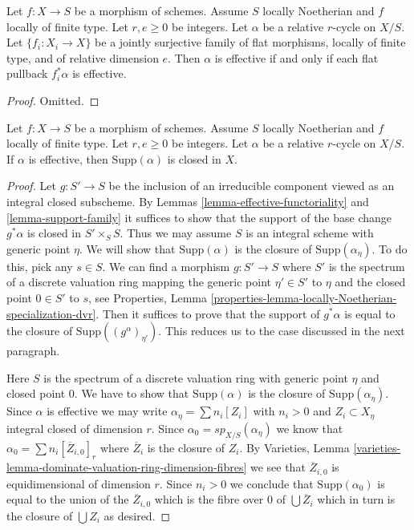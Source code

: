 \begin{lemma}
\label{lemma-effective-descent-pullbacks}
Let $f : X \to S$ be a morphism of schemes. Assume $S$ locally Noetherian
and $f$ locally of finite type. Let $r, e \geq 0$ be integers.
Let $\alpha$ be a relative $r$-cycle on $X/S$.
Let $\{f_i : X_i \to X\}$ be a jointly surjective family
of flat morphisms, locally of finite type, and of relative dimension $e$.
Then $\alpha$ is effective if and only if each flat
pullback $f_i^*\alpha$ is effective.
\end{lemma}

\begin{proof}
Omitted.
\end{proof}

\begin{lemma}
\label{lemma-effective-support-closed}
Let $f : X \to S$ be a morphism of schemes. Assume $S$ locally Noetherian
and $f$ locally of finite type. Let $r, e \geq 0$ be integers.
Let $\alpha$ be a relative $r$-cycle on $X/S$.
If $\alpha$ is effective, then $\text{Supp}(\alpha)$ is
closed in $X$.
\end{lemma}

\begin{proof}
Let $g : S' \to S$ be the inclusion of an irreducible component
viewed as an integral closed subscheme. By
Lemmas \ref{lemma-effective-functoriality} and \ref{lemma-support-family}
it suffices to show that the support of the base change
$g^*\alpha$ is closed in $S' \times_S S$.
Thus we may assume $S$ is an integral scheme with generic point
$\eta$. We will show that $\text{Supp}(\alpha)$ is the closure
of $\text{Supp}(\alpha_\eta)$. To do this, pick any $s \in S$.
We can find a morphism $g : S' \to S$ where $S'$ is the spectrum
of a discrete valuation ring mapping the generic point $\eta' \in S'$ to $\eta$
and the closed point $0 \in S'$ to $s$, see
Properties, Lemma \ref{properties-lemma-locally-Noetherian-specialization-dvr}.
Then it suffices to prove that the support of $g^*\alpha$
is equal to the closure of $\text{Supp}((g^\alpha)_{\eta'})$.
This reduces us to the case discussed in the next paragraph.

\medskip\noindent
Here $S$ is the spectrum of a discrete valuation ring with generic
point $\eta$ and closed point $0$. We have to show that
$\text{Supp}(\alpha)$ is the closure of $\text{Supp}(\alpha_\eta)$.
Since $\alpha$ is effective we may write $\alpha_\eta = \sum n_i[Z_i]$
with $n_i > 0$ and $Z_i \subset X_\eta$ integral closed of dimension $r$.
Since $\alpha_0 = sp_{X/S}(\alpha_\eta)$ we know that
$\alpha_0 = \sum n_i [\overline{Z}_{i, 0}]_r$ where $\overline{Z}_i$
is the closure of $Z_i$. By Varieties, Lemma
\ref{varieties-lemma-dominate-valuation-ring-dimension-fibres}
we see that $\overline{Z}_{i, 0}$ is equidimensional of dimension $r$.
Since $n_i > 0$ we conclude that $\text{Supp}(\alpha_0)$
is equal to the union of the $\overline{Z}_{i, 0}$ which
is the fibre over $0$ of $\bigcup \overline{Z}_i$ which
in turn is the closure of $\bigcup Z_i$ as desired.
\end{proof}

